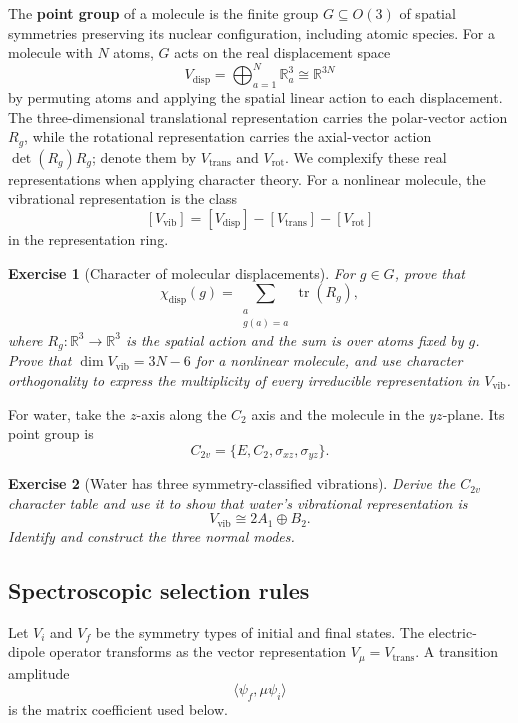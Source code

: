 \documentclass{article}
\newtheorem{exercise}{Exercise}
\newcommand{\trace}{\operatorname{tr}}
\begin{document}
The \textbf{point group} of a molecule is the finite group $G\subseteq O(3)$ of spatial symmetries preserving its nuclear configuration, including atomic species. For a molecule with $N$ atoms, $G$ acts on the real displacement space
\[
V_{\mathrm{disp}}=\bigoplus_{a=1}^N\mathbb R^3_a
\cong\mathbb R^{3N}
\]
by permuting atoms and applying the spatial linear action to each displacement. The three-dimensional translational representation carries the polar-vector action $R_g$, while the rotational representation carries the axial-vector action $\det(R_g)R_g$; denote them by $V_{\mathrm{trans}}$ and $V_{\mathrm{rot}}$. We complexify these real representations when applying character theory. For a nonlinear molecule, the vibrational representation is the class
\[
[V_{\mathrm{vib}}]
=[V_{\mathrm{disp}}]-[V_{\mathrm{trans}}]-[V_{\mathrm{rot}}]
\]
in the representation ring.

\begin{exercise}[Character of molecular displacements]\leavevmode\par
\textit{For $g\in G$, prove that}
\[
\chi_{\mathrm{disp}}(g)
=\sum_{\substack{a\\g(a)=a}}\trace(R_g),
\]
\textit{where $R_g:\mathbb R^3\to\mathbb R^3$ is the spatial action and the sum is over atoms fixed by $g$. Prove that $\dim V_{\mathrm{vib}}=3N-6$ for a nonlinear molecule, and use character orthogonality to express the multiplicity of every irreducible representation in $V_{\mathrm{vib}}$.}
\end{exercise}

For water, take the $z$-axis along the $C_2$ axis and the molecule in the $yz$-plane. Its point group is
\[
C_{2v}=\{E,C_2,\sigma_{xz},\sigma_{yz}\}.
\]
\begin{exercise}[Water has three symmetry-classified vibrations]\leavevmode\par
\textit{Derive the $C_{2v}$ character table and use it to show that water's
vibrational representation is}
\[
V_{\mathrm{vib}}\cong2A_1\oplus B_2.
\]
\textit{Identify and construct the three normal modes.}
\end{exercise}

\subsection{Spectroscopic selection rules}

Let $V_i$ and $V_f$ be the symmetry types of initial and final states. The electric-dipole operator transforms as the vector representation $V_\mu=V_{\mathrm{trans}}$. A transition amplitude
\[
\langle\psi_f,\mu\psi_i\rangle
\]
is the matrix coefficient used below.
\end{document}
